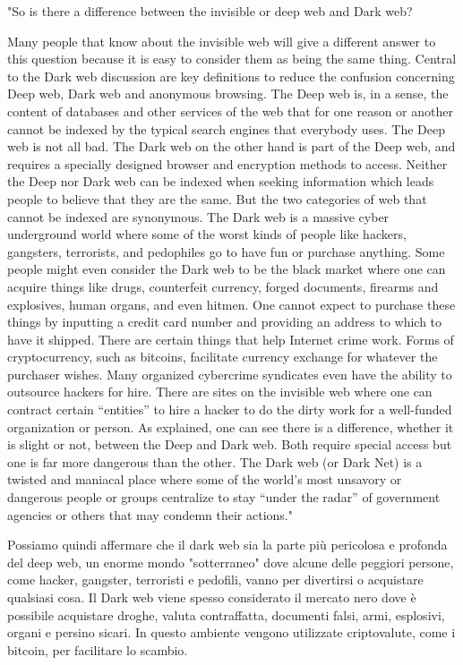 \newpage
"So is there a difference between the invisible or deep web and Dark web?

Many people that know about the invisible web will give a different answer to this question because it is easy to consider them as being the same thing. Central to the Dark web discussion are key definitions to reduce the confusion concerning Deep web, Dark web and anonymous browsing. The Deep web is, in a sense, the content of databases and other services of the web that for one reason or another cannot be indexed by the typical search engines that everybody uses. The Deep web is not all bad. The Dark web on the other hand is part of the Deep web, and requires a specially designed browser and encryption methods to access. Neither the Deep nor Dark web can be indexed when seeking information which leads people to believe that they are the same. But the two categories of web that cannot be indexed are synonymous. The Dark web is a massive cyber underground world where some of the worst kinds of people like hackers, gangsters, terrorists, and pedophiles go to have fun or purchase anything. Some people might even consider the Dark web to be the black market where one can acquire things like drugs, counterfeit currency, forged documents, firearms and explosives, human organs, and even hitmen. One cannot expect to purchase these things by inputting a credit card number and providing an address to which to have it shipped. There are certain things that help Internet crime work. Forms of cryptocurrency, such as bitcoins, facilitate currency exchange for whatever the purchaser wishes. Many organized cybercrime syndicates even have the ability to outsource hackers for hire. There are sites on the invisible web where one can contract certain “entities” to hire a hacker to do the dirty work for a well-funded organization or person. As explained, one can see there is a difference, whether it is slight or not, between the Deep and Dark web. Both require special access but one is far more dangerous than the other. The Dark web (or Dark Net) is a twisted and maniacal place where some of the world’s most unsavory or dangerous people or groups centralize to stay “under the radar” of government agencies or others that may condemn their actions." \cite{darkweb3}

Possiamo quindi affermare che il dark web sia la parte più pericolosa e profonda del deep web, un enorme mondo "sotterraneo" dove alcune delle peggiori persone, come hacker, gangster, terroristi e pedofili, vanno per divertirsi o acquistare qualsiasi cosa.
Il Dark web viene spesso considerato il mercato nero dove è possibile acquistare droghe, valuta contraffatta, documenti falsi, armi, esplosivi, organi e persino sicari. In questo ambiente vengono utilizzate criptovalute, come i bitcoin, per facilitare lo scambio.

